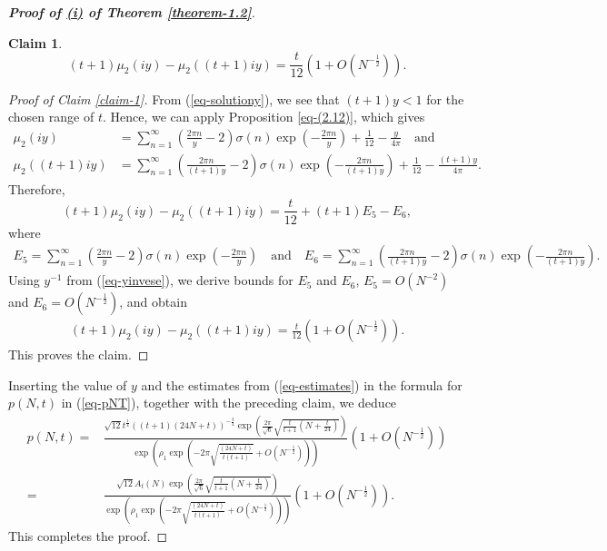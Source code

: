 \documentclass[11pt]{amsart}
\theoremstyle{plain}
\newtheorem{claim}[]{Claim}
\numberwithin{equation}{section}
\begin{document}
\begin{proof}[\textbf{\boldmath Proof of \hyperlink{thm1.2i}{{(i)}} of Theorem \ref{theorem-1.2}}]
\begin{claim}
				\begin{equation*}
					(t+1)\mu_{2}(iy)-\mu_{2}((t+1)iy)=\frac{t}{12}\left(1+O\left(N^{-\frac{1}{2}}\right)\right).
				\end{equation*}
			\end{claim}
			\begin{proof}[Proof of Claim \ref{claim-1}]
				From (\ref{eq-solutiony}), we see that $(t+1)y<1$ for the chosen range of $t$. Hence, we can apply Proposition \ref{eq-(2.12)}, which gives
				\begin{align*}
					\mu_{2}(iy)&=\sum_{n=1}^{\infty}\left(\frac{2\pi n}{y}-2\right)\sigma(n) \exp\left(-\frac{2\pi n}{y}\right)+\frac{1}{12}-\frac{y}{4\pi} \quad\text{and}  \\
					\mu_{2}((t+1)iy)& = \sum_{n=1}^{\infty} \left( \frac{2\pi n}{(t+1)y} - 2 \right) \sigma(n) \exp\left( -\frac{2\pi n}{(t+1)y} \right) + \frac{1}{12} - \frac{(t+1)y}{4\pi}.
				\end{align*}
				Therefore,
				\begin{equation*}
					(t+1)\mu_{2}(iy) - \mu_{2}((t+1)iy) = \frac{t}{12}+(t+1)E_5-E_6, 
				\end{equation*} 
				where \begin{align*}
					E_5=\sum_{n=1}^{\infty}\left(\frac{2\pi n}{y}-2\right)\sigma(n) \exp\left(-\frac{2\pi n}{y}\right) \quad\text{and}\quad E_6= \sum_{n=1}^{\infty} \left( \frac{2\pi n}{(t+1)y} - 2 \right) \sigma(n) \exp\left( -\frac{2\pi n}{(t+1)y} \right). 
				\end{align*}
				Using $y^{-1}$ from (\ref{eq-yinvese}), we derive bounds for $E_5$ and $E_6$, $E_5=O(N^{-2})$ and $E_6=O\left(N^{-\frac{1}{2}}\right)$, and obtain
				\begin{align*}
					(t+1)\mu_{2}(iy) - \mu_{2}((t+1)iy) = \frac{t}{12}\left(1+O\left(N^{-\frac{1}{2}}\right)\right).   
				\end{align*}
				This proves the claim.
			\end{proof}
			Inserting the value of $y$ and the estimates from (\ref{eq-estimates}) in the formula for $p(N,t)$ in (\ref{eq-pNT}), together with the preceding claim, we deduce
			\begin{align*}
				p(N,t)=&\frac{\sqrt{12}t^{\frac{1}{4}}((t+1)(24N+t))^{-\frac{3}{4}}\exp\left(\frac{2\pi}{\sqrt{6}}\sqrt{\frac{t}{t+1}\left(N+\frac{t}{24}\right)}\right)}{\exp\left(\rho_1\exp\left(-2\pi\sqrt{\frac{(24N+t)}{t(t+1)}}+O\left(N^{-\frac{1}{2}}\right)\right)\right)}\left(1+O\left(N^{-\frac{1}{2}}\right)\right) \\
				=&\frac{\sqrt{12}A_{t}(N)\exp\left(\frac{2\pi}{\sqrt{6}}\sqrt{\frac{t}{t+1}\left(N+\frac{t}{24}\right)}\right)}{\exp\left(\rho_1\exp\left(-2\pi\sqrt{\frac{(24N+t)}{t(t+1)}}+O\left(N^{-\frac{1}{2}}\right)\right)\right)}\left(1+O\left(N^{-\frac{1}{2}}\right)\right).   
			\end{align*} 
			This completes the proof.
		\end{proof}
\end{document}
